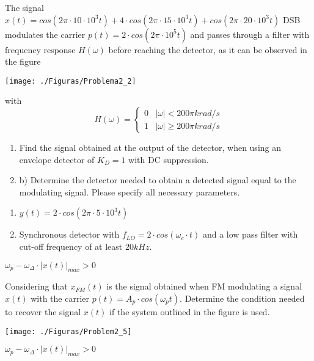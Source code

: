 \documentclass[en,boletin]{uah}
\begin{document}
		{
	
			The signal $x(t) = cos(2\pi\cdot 10\cdot 10^3 t)+4\cdot cos(2\pi\cdot 15 \cdot10^3 t)+cos(2\pi \cdot 20\cdot10^3 t)$ DSB modulates the carrier $p(t)=2\cdot cos(2\pi \cdot 10^5 t)$ and passes through a filter with frequency response $H(\omega)$ before reaching the detector, as it can be observed in the figure
			{\begin{figure*}[h!]\centering\texttt{[image: ./Figuras/Problema2\_2]}\end{figure*}}
		
		
			with
			\begin{displaymath}
				H(\omega)=\left \{ \begin{array}{ll}
					0 & |\omega|<200\pi krad/s  \\
					1 & |\omega|\geq200\pi krad/s
				\end{array}
				\right.
			\end{displaymath}
		
			\begin{enumerate}
				\item Find the signal obtained at the output of the detector, when using an envelope detector of $K_D=1$ with DC suppression. 
				\item b)	Determine the detector needed to obtain a detected signal equal to the modulating signal. Please specify all necessary parameters.
			\end{enumerate} 
			}
			{
				\begin{enumerate}
					\item $y(t)=2\cdot cos(2\pi \cdot 5 \cdot 10^3t)$
					\item Synchronous detector with $f_{LO} = 2 \cdot cos(\omega_c \cdot t)$ 	and a low pass filter with cut-off frequency of at least $20kHz$.
				\end{enumerate}
			}
	



		{
		$\omega_p - \omega_\Delta \cdot |x(t)|_{max} > 0$
		
		}
		{
		
			Considering that $x_{FM}(t)$ is the signal obtained when FM modulating a signal $x(t)$ with the carrier $p(t)=A_p \cdot cos(\omega_p t)$. Determine the condition needed to recover the signal $x(t)$ if the system outlined in the figure is used.
			
			{\begin{figure*}[h!]\centering\texttt{[image: ./Figuras/Problem2\_5]}\end{figure*}}
		}
		{
		$\omega_p - \omega_\Delta \cdot |x(t)|_{max} > 0$
		
		}
		
\end{document}
